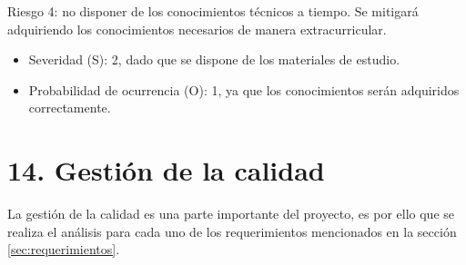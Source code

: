 \documentclass[
11pt, %
]{charter}
\begin{document}
Riesgo 4: no disponer de los conocimientos técnicos a tiempo. Se mitigará adquiriendo los conocimientos necesarios de manera extracurricular.
\begin{itemize}
	\item Severidad (S): 2, dado que se dispone de los materiales de estudio.
	\item Probabilidad de ocurrencia (O): 1, ya que los conocimientos serán adquiridos correctamente. 
\end{itemize}


\section{14. Gestión de la calidad}
\label{sec:calidad}
La gestión de la calidad es una parte importante del proyecto, es por ello que se realiza el análisis para cada uno de los requerimientos mencionados en la sección \ref{sec:requerimientos}.
\end{document}
